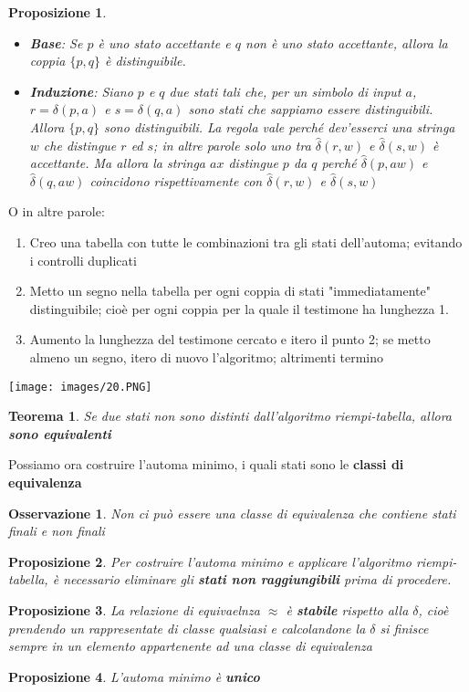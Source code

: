 \documentclass[12pt]{article}
\newtheorem{Teorema}{Teorema}[subsection]
\newtheorem{Proposizione}{Proposizione}[subsection]
\newtheorem{Osservazione}{Osservazione}[subsection]
\begin{document}
\begin{Proposizione} \hphantom{0}
    \begin{itemize}
        \item \textbf{Base}: Se $p$ è uno stato accettante e $q$ non è uno stato accettante, allora la coppia $\{p, q\}$ è distinguibile.
        \item \textbf{Induzione}: Siano $p$ e $q$ due stati tali che, per un simbolo di input $a$, $r = \delta(p, a)$ e $s = \delta(q, a)$ sono stati che sappiamo essere distinguibili. Allora $\{p, q\}$ sono distinguibili. La regola vale perché dev'esserci una stringa $w$ che distingue $r$ ed $s$; in altre parole solo uno tra $\hat{\delta}(r, w)$ e $\hat{\delta}(s, w)$ è accettante. Ma allora la stringa $ax$ distingue $p$ da $q$ perché $\hat{\delta}(p, aw)$ e $\hat{\delta}(q, aw)$ coincidono rispettivamente con $\hat{\delta}(r, w)$ e $\hat{\delta}(s, w)$
    \end{itemize}
\end{Proposizione}
O in altre parole:
\begin{enumerate}
    \item Creo una tabella con tutte le combinazioni tra gli stati dell'automa; evitando i controlli duplicati
    \item Metto un segno nella tabella per ogni coppia di stati "immediatamente" distinguibile; cioè per ogni coppia per la quale il testimone ha lunghezza 1.
    \item Aumento la lunghezza del testimone cercato e itero il punto 2; se metto almeno un segno, itero di nuovo l'algoritmo; altrimenti termino
\end{enumerate}
\begin{center}
    \texttt{[image: images/20.PNG]}
\end{center}
\begin{Teorema}
    Se due stati non sono distinti dall'algoritmo riempi-tabella, allora \textbf{sono equivalenti}
\end{Teorema}
Possiamo ora costruire l'automa minimo, i quali stati sono le \textbf{classi di equivalenza}
\begin{Osservazione}
    Non ci può essere una classe di equivalenza che contiene stati finali e non finali
\end{Osservazione}
\begin{Proposizione}
    Per costruire l'automa minimo e applicare l'algoritmo riempi-tabella, è necessario eliminare gli \textbf{stati non raggiungibili} prima di procedere.
\end{Proposizione}
\begin{Proposizione}
    La relazione di equivaelnza $\approx$ è \textbf{stabile} rispetto alla $\delta$, cioè prendendo un rappresentate di classe qualsiasi e calcolandone la $\delta$ si finisce sempre in un elemento appartenente ad una classe di equivalenza
\end{Proposizione}
\begin{Proposizione}
    L'automa minimo è \textbf{unico}
\end{Proposizione}
\end{document}
